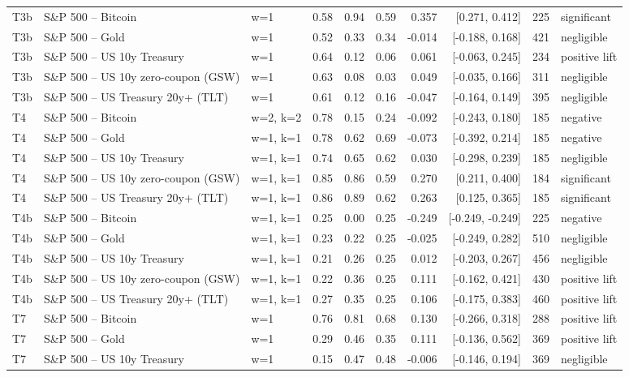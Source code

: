 \begin{figure}
\begin{tabular}{lllrrrrrrl}
T3b & S\&P 500 -- Bitcoin & w=1 & 0.58 & 0.94 & 0.59 & 0.357 & [0.271, 0.412] & 225 & significant \\
T3b & S\&P 500 -- Gold & w=1 & 0.52 & 0.33 & 0.34 & -0.014 & [-0.188, 0.168] & 421 & negligible \\
T3b & S\&P 500 -- US 10y Treasury & w=1 & 0.64 & 0.12 & 0.06 & 0.061 & [-0.063, 0.245] & 234 & positive lift \\
T3b & S\&P 500 -- US 10y zero-coupon (GSW) & w=1 & 0.63 & 0.08 & 0.03 & 0.049 & [-0.035, 0.166] & 311 & negligible \\
T3b & S\&P 500 -- US Treasury 20y+ (TLT) & w=1 & 0.61 & 0.12 & 0.16 & -0.047 & [-0.164, 0.149] & 395 & negligible \\
T4 & S\&P 500 -- Bitcoin & w=2, k=2 & 0.78 & 0.15 & 0.24 & -0.092 & [-0.243, 0.180] & 185 & negative \\
T4 & S\&P 500 -- Gold & w=1, k=1 & 0.78 & 0.62 & 0.69 & -0.073 & [-0.392, 0.214] & 185 & negative \\
T4 & S\&P 500 -- US 10y Treasury & w=1, k=1 & 0.74 & 0.65 & 0.62 & 0.030 & [-0.298, 0.239] & 185 & negligible \\
T4 & S\&P 500 -- US 10y zero-coupon (GSW) & w=1, k=1 & 0.85 & 0.86 & 0.59 & 0.270 & [0.211, 0.400] & 184 & significant \\
T4 & S\&P 500 -- US Treasury 20y+ (TLT) & w=1, k=1 & 0.86 & 0.89 & 0.62 & 0.263 & [0.125, 0.365] & 185 & significant \\
T4b & S\&P 500 -- Bitcoin & w=1, k=1 & 0.25 & 0.00 & 0.25 & -0.249 & [-0.249, -0.249] & 225 & negative \\
T4b & S\&P 500 -- Gold & w=1, k=1 & 0.23 & 0.22 & 0.25 & -0.025 & [-0.249, 0.282] & 510 & negligible \\
T4b & S\&P 500 -- US 10y Treasury & w=1, k=1 & 0.21 & 0.26 & 0.25 & 0.012 & [-0.203, 0.267] & 456 & negligible \\
T4b & S\&P 500 -- US 10y zero-coupon (GSW) & w=1, k=1 & 0.22 & 0.36 & 0.25 & 0.111 & [-0.162, 0.421] & 430 & positive lift \\
T4b & S\&P 500 -- US Treasury 20y+ (TLT) & w=1, k=1 & 0.27 & 0.35 & 0.25 & 0.106 & [-0.175, 0.383] & 460 & positive lift \\
T7 & S\&P 500 -- Bitcoin & w=1 & 0.76 & 0.81 & 0.68 & 0.130 & [-0.266, 0.318] & 288 & positive lift \\
T7 & S\&P 500 -- Gold & w=1 & 0.29 & 0.46 & 0.35 & 0.111 & [-0.136, 0.562] & 369 & positive lift \\
T7 & S\&P 500 -- US 10y Treasury & w=1 & 0.15 & 0.47 & 0.48 & -0.006 & [-0.146, 0.194] & 369 & negligible \\

\end{tabular}
\end{figure}
